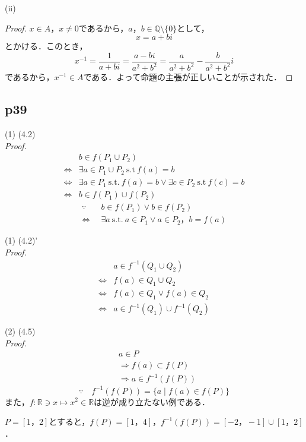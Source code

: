 \documentclass[dvipdfmx,uplatex,11pt]{jsarticle}
\begin{document}
(ii)
\begin{leftbar}
    \begin{proof}
        $x \in A$，$x \ne 0$であるから，$a，b \in \mathbb{Q} \setminus \{0\}$として，
        \[
            x=a+bi
        \]
        とかける．このとき，
        \[
        x^{-1}=\frac{1}{a+bi}=\frac{a-bi}{a^2+b^2} = \frac{a}{a^2+b^2} - \frac{b}{a^2+b^2} i
        \]
        であるから，$x^{-1} \in A$である．よって命題の主張が正しいことが示された．
    \end{proof}
\end{leftbar}
\subsection{p39}
\begin{screen}
    (1) \quad (4.2) \\
{\it Proof.}
\begin{align*}
    & b \in f(P_1 \cup P_2) \\
    \iff & \exists a \in P_1 \cup P_2 ~ \mathrm{s.t} ~ f(a)=b \\
    \iff & \exists a \in P_1 ~\mathrm{s.t.} ~ f(a)=b \lor \exists c \in P_2 ~ \mathrm{s.t} ~ f(c)=b \\
    \iff & b \in f(P_1) \cup f(P_2) 
\end{align*}
\dotfill 
\begin{align*}
\because  \quad  & b \in f(P_1) \lor b \in f(P_2) \\
\iff & \exists a ~ \mathrm{s.t.} ~ a \in P_1 \lor a \in P_2 ，b = f(a)
\end{align*}
\end{screen}
\begin{screen}
    (1) \quad (4.2)' \\
    {\it Proof.}
\begin{align*}
    & a \in f^{-1} (Q_1 \cup Q_2) \\
    \iff & f(a) \in Q_1 \cup Q_2 \\
    \iff & f(a)  \in Q_1 \lor f(a) \in Q_2 \\
    \iff & a \in f^{-1} (Q_1) \cup f^{-1} (Q_2)
\end{align*}
\end{screen}
\begin{screen}
    (2) \quad (4.5) \\
    {\it Proof.}
    \begin{align*}
        & a \in P \\
       & \Longrightarrow  f(a) \subset f(P) \\
       & \Longrightarrow a \in f^{-1} (f(P))
    \end{align*}
    \dotfill 
    \[
        \because \quad f^{-1} (f(P)) = \{ a \mid f(a)\in f(P)\}
        \]
    また，$f \colon \mathbb{R} \ni x \mapsto x^2 \in \mathbb{R}$は逆が成り立たない例である．\par
    $P=[1，2]$とすると，$f(P)=[1，4]$，$f^{-1}(f(P))=[-2，-1] \cup [1，2]$．
\end{screen}
\end{document}
